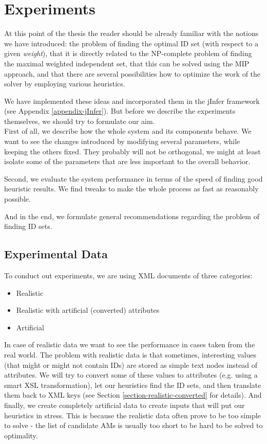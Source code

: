 \chapter{Experiments}

At this point of the thesis the reader should be already familiar with the notions we have introduced: the problem of finding the optimal ID set (with respect to a given \textit{weight}), that it is directly related to the NP-complete problem of finding the maximal weighted independent set, that this can be solved using the MIP approach, and that there are several possibilities how to optimize the work of the solver by employing various heuristics.

We have implemented these ideas and incorporated them in the jInfer framework (see Appendix \ref{appendix-jInfer}). But before we describe the experiments themselves, we should try to formulate our aim.\\

First of all, we describe how the whole system and its components behave. We want to see the changes introduced by modifying several parameters, while keeping the others fixed. They probably will not be orthogonal, we might at least isolate some of the parameters that are less important to the overall behavior.

Second, we evaluate the system performance in terms of the speed of finding good heuristic results. We find tweaks to make the whole process as fast as reasonably possible.

And in the end, we formulate general recommendations regarding the problem of finding ID sets.

\section{Experimental Data}
\label{section-experiments-data}

To conduct out experiments, we are using XML documents of three categories:

\begin{itemize}
	\item Realistic
	\item Realistic with artificial (converted) attributes
	\item Artificial
\end{itemize}

In case of realistic data we want to see the performance in cases taken from the real world. The problem with realistic data is that sometimes, interesting values (that might or might not contain IDs) are stored as simple text nodes instead of attributes. We will try to convert some of these values to attributes (e.g. using a smart XSL transformation), let our heuristics find the ID sets, and then translate them back to XML keys (see Section \ref{section-realistic-converted} for details).
And finally, we create completely artificial data to create inputs that will put our heuristics in stress. This is because the realistic data often prove to be too simple to solve - the list of candidate AMs is usually too short to be hard to be solved to optimality.

